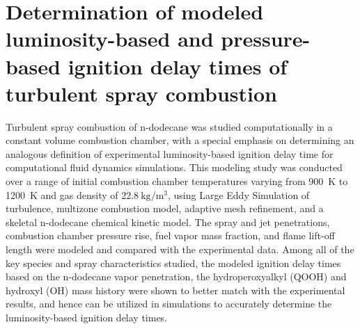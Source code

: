 \documentclass[a4paper,10pt]{article}
\begin{document}
\section{Determination of modeled luminosity-based and pressure-based ignition delay times of turbulent spray combustion}
Turbulent spray combustion of n-dodecane was studied computationally in a constant volume combustion chamber, with a special emphasis on determining an analogous definition of experimental luminosity-based ignition delay time for computational fluid dynamics simulations.
This modeling study was conducted over a range of initial combustion chamber temperatures varying from \SI{900}{\kelvin} to \SI{1200}{\kelvin} and gas density of $\SI{22.8}{\kg/\meter^3}$, using Large Eddy Simulation of turbulence, multizone combustion model, adaptive mesh refinement, and a skeletal n-dodecane chemical kinetic model.
The spray and jet penetrations, combustion chamber pressure rise, fuel vapor mass fraction, and flame lift-off length were modeled and compared with the experimental data. Among all of the key species and spray characteristics studied, the modeled ignition delay times based on the n-dodecane vapor penetration, the hydroperoxyalkyl (QOOH) and hydroxyl (OH) mass history were shown to better match with the experimental results, and hence can be utilized in simulations to accurately determine the luminosity-based ignition delay times.






\end{document}
